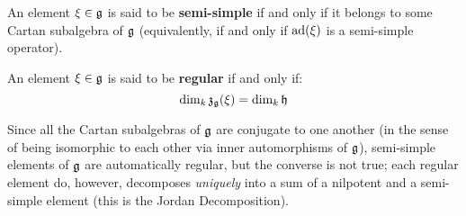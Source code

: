         \begin{definition} \label{def: semi_simple_elements}
            An element $\xi \in \mathfrak{g}$ is said to be \textbf{semi-simple} if and only if it belongs to some Cartan subalgebra of $\mathfrak{g}$ (equivalently, if and only if $\mathrm{ad}(\xi)$ is a semi-simple operator). 
        \end{definition}
        \begin{definition} \label{def: regular_elements}
            An element $\xi \in \mathfrak{g}$ is said to be \textbf{regular} if and only if:
                $$\dim_k \mathfrak{z}_{\mathfrak{g}}(\xi) = \dim_k \mathfrak{h}$$
        \end{definition}
        \begin{remark}
            Since all the Cartan subalgebras of $\mathfrak{g}$ are conjugate to one another (in the sense of being isomorphic to each other via inner automorphisms of $\mathfrak{g}$), semi-simple elements of $\mathfrak{g}$ are automatically regular, but the converse is not true; each regular element do, however, decomposes \textit{uniquely} into a sum of a nilpotent and a semi-simple element (this is the Jordan Decomposition).
        \end{remark}

